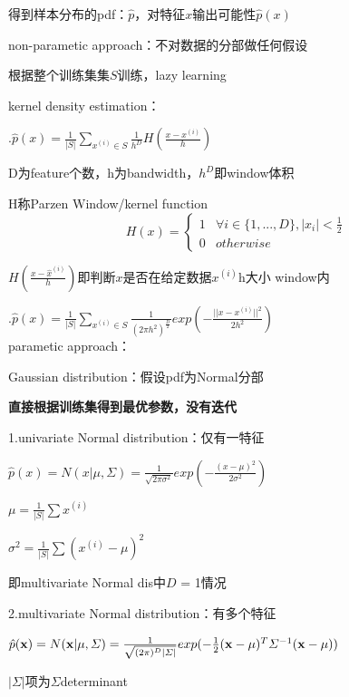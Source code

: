 \documentclass[UTF8]{ctexart}
\begin{document}
  得到样本分布的pdf：$\hat{p}$，对特征$x$输出可能性$\hat{p}(x)$

  non-parametic approach：不对数据的分部做任何假设
  
  \quad 根据整个训练集集$S$训练，lazy learning

  \quad kernel density estimation：

  \quad {}.$\hat{p}(x) = \frac{1}{|S|}\sum_{x^{(i)} \in S}\frac{1}{h^D}H(\frac{x - x^{(i)}}{h})$

  \quad \quad \quad D为feature个数，h为bandwidth，$h^D$即window体积

  \quad \quad \quad H称Parzen Window/kernel function\begin{equation*}
    H(x) = \begin{cases}
    1 &\forall i \in \{1, ..., D\}, |x_i| < \frac{1}{2}\\
    0 & otherwise
    \end{cases}
  \end{equation*}
  
  \quad \quad \quad $H(\frac{x - \hat{x}^{(i)}}{h})$即判断$x$是否在给定数据$x^{(i)}$h大小 window内

  \quad {}.$\hat{p}(x) = \frac{1}{|S|}\sum_{x^{(i)} \in S}\frac{1}{(2 \pi h^2)^{\frac{D}{2}}}exp(-\frac{||x - x^{(i)}||^2}{2h^2})$\\

  parametic approach：

  \quad Gaussian distribution：假设pdf为Normal分部

  \quad \quad \textbf{直接根据训练集得到最优参数，没有迭代}

  \quad \quad 1.univariate Normal distribution：仅有一特征
  
  \quad \quad \quad $\hat{p}(x) = N(x|\mu, \varSigma) = \frac{1}{\sqrt{2\pi \sigma^2}}exp(-\frac{(x - \mu)^2}{2\sigma^2})$

  \quad \quad \quad \quad $\mu = \frac{1}{|S|}\sum x^{(i)}$

  \quad \quad \quad \quad $\sigma^2 = \frac{1}{|S|}\sum(x^{(i)} - \mu)^2$

  \quad \quad \quad \quad 即multivariate Normal dis中$D$ = 1情况

  \quad \quad 2.multivariate Normal distribution：有多个特征
  
  \quad \quad \quad $\hat{p}({\bf x}) = N({\bf x}|\mu, \varSigma) = \frac{1}{\sqrt{(2\pi)^D|\varSigma|}}exp(-\frac{1}{2}({\bf x}-\mu)^T\varSigma^{-1}({\bf x}-\mu))$

  \quad \quad \quad \quad $|\varSigma|$项为$\varSigma$determinant
\end{document}
